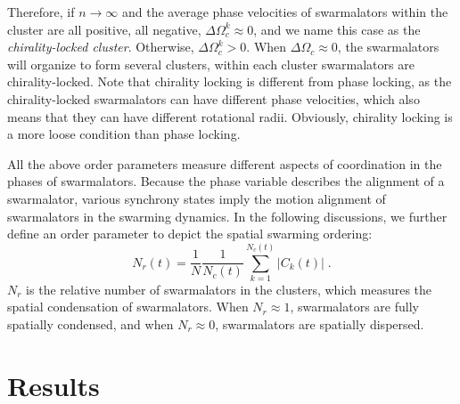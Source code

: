 \documentclass{article}
\begin{document}
Therefore, if $n\rightarrow\infty$ and the average phase velocities of swarmalators within the cluster are all positive, all negative, $\Delta \Omega _{c}^{k}\approx0$, and we name this case as the \textit{chirality-locked cluster}. Otherwise, $\Delta \Omega _{c}^{k}>0$. 
When $\Delta\Omega_c \approx 0$, the swarmalators will organize to form several clusters, within each cluster swarmalators are chirality-locked. 
Note that chirality locking is different from phase locking, as the chirality-locked swarmalators can have different phase velocities, which also means that they can have different rotational radii. 
Obviously, chirality locking is a more loose condition than phase locking. 

All the above order parameters measure different aspects of coordination in the phases of swarmalators. Because the phase variable describes the alignment of a swarmalator, various synchrony states imply the motion alignment of swarmalators in the swarming dynamics. 
In the following discussions, we further define an order parameter to depict the spatial swarming ordering:
\begin{equation}
    \label{eq:relativeNumber}
    N_r\left( t \right) =\frac{1}{N}\frac{1}{N_c\left( t \right)}\sum_{k=1}^{N_c\left( t \right)}{\left| C_k\left( t \right) \right|}\;.
\end{equation}
$N_r$ is the relative number of swarmalators in the clusters, which measures the spatial condensation of swarmalators. When $N_r\approx 1$, swarmalators are fully spatially condensed, and when $N_r\approx 0$, swarmalators are spatially dispersed. 

\newpage
\section{Results}
\end{document}
